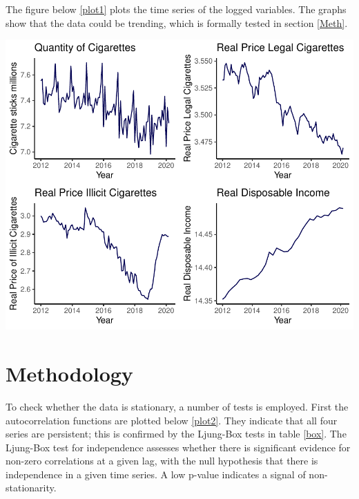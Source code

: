 \documentclass[11pt,preprint, authoryear]{elsarticle}
\let\origfigure\figure
\let\endorigfigure\endfigure
\renewenvironment{figure}[1][2] {
    \expandafter\origfigure\expandafter[H]
} {
    \endorigfigure
}
\numberwithin{equation}{section}
\numberwithin{figure}{section}
\numberwithin{table}{section}
\begin{document}
The figure below \ref{plot1} plots the time series of the logged
variables. The graphs show that the data could be trending, which is
formally tested in section \ref{Meth}.

\begin{figure}

{\centering \includegraphics{Thesis_Draft_files/figure-latex/Figure2-1} 

}

\caption{Time Series Plot \label{plot1}}\label{fig:Figure2}
\end{figure}

\hypertarget{methodology}{%
\section{\texorpdfstring{Methodology
\label{Meth}}{Methodology }}\label{methodology}}

To check whether the data is stationary, a number of tests is employed.
First the autocorrelation functions are plotted below \ref{plot2}. They
indicate that all four series are persistent; this is confirmed by the
Ljung-Box tests in table \ref{box}. The Ljung-Box test for independence
assesses whether there is significant evidence for non-zero correlations
at a given lag, with the null hypothesis that there is independence in a
given time series. A low p-value indicates a signal of non-stationarity.
\end{document}
